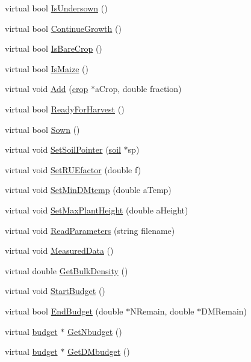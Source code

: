 \begin{DoxyCompactItemize}
\item 
virtual bool \hyperlink{classcrop_ae3212213482a95d8946090c5a481f551}{IsUndersown} ()
\item 
virtual bool \hyperlink{classcrop_a1fc1c31116ee5b1254d4893e83633f21}{ContinueGrowth} ()
\item 
virtual bool \hyperlink{classcrop_a8dd9a3a833e045f767eb3a6abd5f9677}{IsBareCrop} ()
\item 
virtual bool \hyperlink{classcrop_ac831e55c0840bb1008c4d91d2c00a47a}{IsMaize} ()
\item 
virtual void \hyperlink{classcrop_a09c265a1590e65269b0f767da95dc85f}{Add} (\hyperlink{classcrop}{crop} $\ast$aCrop, double fraction)
\item 
virtual bool \hyperlink{classcrop_a8f2d5d0807fb0a81e50ea09e6df594ac}{ReadyForHarvest} ()
\item 
virtual bool \hyperlink{classcrop_a218928e354da6f48a953731f2b5da527}{Sown} ()
\item 
virtual void \hyperlink{classcrop_a68b4dca8529ca2be2d18541a4249bba5}{SetSoilPointer} (\hyperlink{classsoil}{soil} $\ast$sp)
\item 
virtual void \hyperlink{classcrop_a750cc1981b6d1fcb6e1a1e43bb22accf}{SetRUEfactor} (double f)
\item 
virtual void \hyperlink{classcrop_a9b0b91147d9172c43e4ea336e5b2d3f8}{SetMinDMtemp} (double aTemp)
\item 
virtual void \hyperlink{classcrop_ab5f2bbf268e6d623d0a69cc4a37049fb}{SetMaxPlantHeight} (double aHeight)
\item 
virtual void \hyperlink{classcrop_af0b1a78d5cf3e32cf24c762e1dfb4048}{ReadParameters} (string filename)
\item 
virtual void \hyperlink{classcrop_a87faf3aada27a5f2bfc506bf265d67b7}{MeasuredData} ()
\item 
virtual double \hyperlink{classcrop_a9346991c7b35dd7767dec41314a26274}{GetBulkDensity} ()
\item 
virtual void \hyperlink{classcrop_a8c3a80a0de839c07691add129dbacafa}{StartBudget} ()
\item 
virtual bool \hyperlink{classcrop_aaacb9f08e608ce328d60a25813a49ca5}{EndBudget} (double $\ast$NRemain, double $\ast$DMRemain)
\item 
virtual \hyperlink{classbudget}{budget} $\ast$ \hyperlink{classcrop_aa5d7748725ee956e02db1e248ddaa9fb}{GetNbudget} ()
\item 
virtual \hyperlink{classbudget}{budget} $\ast$ \hyperlink{classcrop_aa0a404571c0eaf2f5d836f330d7c3b07}{GetDMbudget} ()

\end{DoxyCompactItemize}
